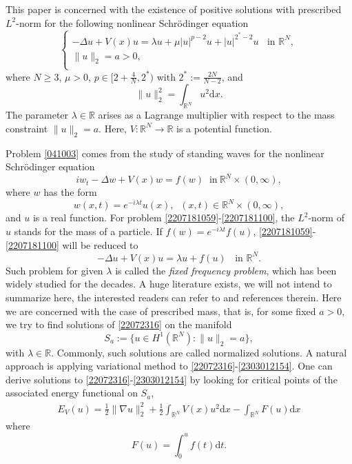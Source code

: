 \documentclass[10pt]{article}
\numberwithin{equation}{section}
\newcommand{\ud}{\mathrm{d}}
\numberwithin{equation}{section}
\begin{document}
This paper is concerned with the existence of positive solutions with prescribed $L^2$-norm for the following nonlinear Schr\"{o}dinger equation
\begin{equation}\label{041003}
\begin{cases}
-\Delta u+V(x)u=\lambda u+\mu |u|^{p-2}u+|u|^{2^{*}-2}u \;\;\text { in } \mathbb{R}^N, \\
\|u\|_2=a>0,\\
\end{cases}
\end{equation}
where $N\ge 3$, $\mu>0$, $p\in [2+\frac{4}{N},2^{*})$ with
$2^{*}:=\frac{2N}{N-2}$, and
$$\|u\|^2_2=\int_{\mathbb{R}^N} u^2 \ud x.$$
 The parameter $\lambda\in\mathbb{R}$ arises as a Lagrange multiplier with respect to the mass constraint $\|u\|_{2}=a$. Here, $V : \mathbb{R}^N\to \mathbb{R}$ is a potential function.\par
 Problem \eqref{041003} comes from the study of standing waves for the nonlinear Schr\"{o}dinger equation
\begin{equation}\label{2207181059}
    iw_t-\Delta w + V(x)w=f(w) \;\; \text{in}~ \mathbb{R}^N\times (0,\infty),
\end{equation}
where $w$ has the form
\begin{equation}\label{2207181100}
w(x,t)=e^{-i\lambda t} u(x),\;\; (x,t)\in \mathbb{R}^N\times (0,\infty),
\end{equation}
and $u$ is a real function. For problem \eqref{2207181059}-\eqref{2207181100}, the $L^2$-norm of $u$ stands for the mass of a particle. If $f(w)=e^{-i\lambda t}f(u)$, \eqref{2207181059}-\eqref{2207181100} will be reduced to
\begin{equation}\label{22072316}
 -\Delta u+V(x)u=\lambda u+f(u) \;\;\text { in } \mathbb{R}^N.
\end{equation}
Such problem for given $\lambda$ is called the {\it fixed frequency problem}, which has been widely studied for the decades. A huge literature exists, we will not intend to summarize here, the interested readers can refer to \cite{Ambrosetti2006, Cerami2006, Struwe2008} and references therein. Here we are concerned with the case of  prescribed mass, that is, for some fixed $a>0$, we try to find solutions of \eqref{22072316} on the manifold
\begin{equation}\label{2303012154}
S_a:=\{u\in H^1(\mathbb{R}^N):\|u\|_{2}=a\},
\end{equation}
with $\lambda\in\mathbb{R}$. Commonly, such solutions are called normalized solutions. A natural approach is applying variational method to \eqref{22072316}-\eqref{2303012154}. One can derive solutions to \eqref{22072316}-\eqref{2303012154} by looking for critical points of the associated energy functional on $S_a$,
\begin{equation}\label{2303021513}
\begin{aligned}
E_{V}(u)=\frac{1}{2}\|\nabla u\|_2^2 +\frac12 \int_{\mathbb{R}^N}V(x)u^2\ud x-\int_{\mathbb{R}^N}F(u) \ud x
\end{aligned}
\end{equation}
where
$$F(u) =\int_0^{u}f(t)\ud t.$$
\end{document}
